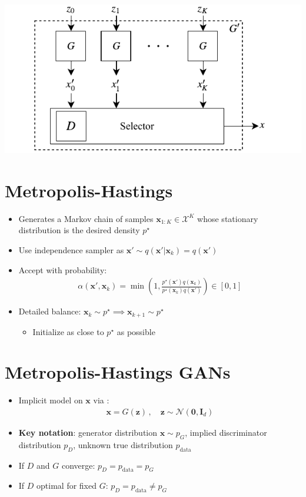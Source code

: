 \documentclass[a0,landscape]{a0poster}
\newcommand{\mysection}[1]{\section*{\fontsize{67.1}{82} \selectfont \color{NavyBlue} #1 \color{Black}}}
\renewcommand{\vec}[1]{{\boldsymbol{\mathbf{#1}}}} %
\newcommand{\R}{\mathbb{R}}
\newcommand{\set}[1]{\mathcal{#1}}
\newcommand{\sample}{\sim}
\newcommand{\given}{|}
\newcommand{\norm}{\mathcal{N}}
\newcommand{\target}{{p^\star}}
\newcommand{\prop}{q}
\newcommand{\pinit}{{p_0}}
\newcommand{\PG}{{p_G}}
\newcommand{\PD}{{p_D}}
\newcommand{\PR}{{p_{\textrm{data}}}}
\newcommand{\accept}{\alpha}
\newcommand{\setx}{\set{X}}
\begin{document}
\begin{multicols}{3}
\hspace{7mm}
\includegraphics[scale=2.75]{../figures/block_diag.pdf}
\vspace{-2cm}

\mysection{Metropolis-Hastings}

\begin{itemize}
  \item Generates a Markov chain of samples $\vec x_{1:K} \in \setx^K$ whose stationary distribution is the desired density $\target$
  \item Use independence sampler as $\vec x' \sample \prop(\vec x' \given \vec x_k)=\prop(\vec x')$
  \item Accept with probability:
  \begin{align}
    \accept(\vec x', \vec x_k) = \min\left(1, \frac{\target(\vec x')\prop(\vec x_k)}{\target(\vec x_k)\prop(\vec x')}\right) \in [0,1]
  \end{align}
  \item Detailed balance: $\vec x_k \sample \target \implies \vec x_{k+1} \sample \target$
  \begin{itemize}
    \item Initialize as close to $\target$ as possible
  \end{itemize}
\end{itemize}

\columnbreak

\mysection{Metropolis-Hastings GANs}

\begin{itemize}
  \item Implicit model on $\vec x$ via \smash{$G \in \R^{d} \rightarrow \setx$}:
  \begin{align}
    \vec x = G(\vec z)\,, \quad \vec z \sample \norm(\vec 0, \vec I_{d})
  \end{align}
  \item \textbf{Key notation}: generator distribution $\vec x \sample \PG$, implied discriminator distribution $\PD$, unknown true distribution $\PR$
  \item If $D$ and $G$ converge: $\PD = \PR = \PG$
  \item If $D$ optimal for fixed $G$: $\PD = \PR \neq \PG$
\end{itemize}


\end{multicols}
\end{document}
